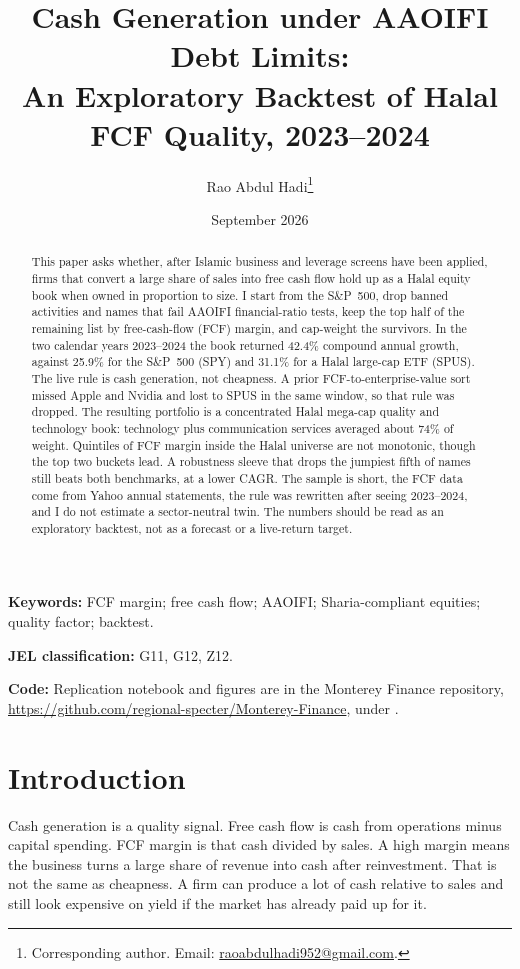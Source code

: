 \documentclass[11pt,letterpaper]{article}
\title{\textbf{Cash Generation under AAOIFI Debt Limits:\\
An Exploratory Backtest of Halal FCF Quality, 2023--2024}}
\author[1]{Rao Abdul Hadi\thanks{Corresponding author. Email: \href{mailto:raoabdulhadi952@gmail.com}{raoabdulhadi952@gmail.com}.}}
\affil[1]{Monterey Finance, Halal Quant Research Lab}
\date{September 2026}
\begin{document}
\maketitle

\begin{abstract}
\noindent
This paper asks whether, after Islamic business and leverage screens have been applied, firms that convert a large share of sales into free cash flow hold up as a Halal equity book when owned in proportion to size. I start from the S\&P~500, drop banned activities and names that fail AAOIFI financial-ratio tests, keep the top half of the remaining list by free-cash-flow (FCF) margin, and cap-weight the survivors. In the two calendar years 2023--2024 the book returned 42.4\% compound annual growth, against 25.9\% for the S\&P~500 (SPY) and 31.1\% for a Halal large-cap ETF (SPUS). The live rule is cash generation, not cheapness. A prior FCF-to-enterprise-value sort missed Apple and Nvidia and lost to SPUS in the same window, so that rule was dropped. The resulting portfolio is a concentrated Halal mega-cap quality and technology book: technology plus communication services averaged about 74\% of weight. Quintiles of FCF margin inside the Halal universe are not monotonic, though the top two buckets lead. A robustness sleeve that drops the jumpiest fifth of names still beats both benchmarks, at a lower CAGR. The sample is short, the FCF data come from Yahoo annual statements, the rule was rewritten after seeing 2023--2024, and I do not estimate a sector-neutral twin. The numbers should be read as an exploratory backtest, not as a forecast or a live-return target.
\end{abstract}

\noindent\textbf{Keywords:}
FCF margin; free cash flow; AAOIFI; Sharia-compliant equities; quality factor; backtest.

\noindent\textbf{JEL classification:} G11, G12, Z12.

\noindent\textbf{Code:}
Replication notebook and figures are in the Monterey Finance repository,
\url{https://github.com/regional-specter/Monterey-Finance},
under .

\section{Introduction}

Cash generation is a quality signal. Free cash flow is cash from operations minus capital spending. FCF margin is that cash divided by sales. A high margin means the business turns a large share of revenue into cash after reinvestment. That is not the same as cheapness. A firm can produce a lot of cash relative to sales and still look expensive on yield if the market has already paid up for it.
\end{document}
